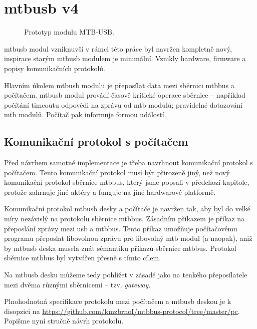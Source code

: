 \section{\gls{mtbusb} v4}

\begin{figure}[ht]
\caption{Prototyp modulu MTB-USB.}
\label{fig:mtbusb-prototype}
\end{figure}

\gls{mtbusb} modul vzniknuvší v rámci této práce byl navržen kompletně nový,
inspirace starým \gls{mtbusb} modulem je minimální. Vznikly hardware, firmware
a popisy komunikačních protokolů.

Hlavním úkolem \gls{mtbusb} modulu je přeposílat data mezi sběrnici \gls{mtbbus}
a počítačem. \gls{mtbusb} modul provádí časově kritické operace sběrnice
 – například počítání timeoutu odpovědi na zprávu od \gls{mtb} modulů; pravidelné
dotazování \gls{mtb} modulů. Počítač pak informuje formou událostí.

\subsection{Komunikační protokol s počítačem}

Před návrhem samotné implementace je třeba navrhnout komunikační protokol
s počítačem. Tento komunikační protokol musí být přirozeně jiný, než nový
komunikační protokol sběrnice \gls{mtbbus}, který jsme popsali v předchozí
kapitole, protože zahrnuje jiné aktéry a funguje na jiné hardwarové platformě.

Komunikační protokol \gls{mtbusb} desky a počítače je navržen tak, aby byl do
velké míry nezávislý na protokolu sběrnice \gls{mtbbus}. Zásadním příkazem
je příkaz na přeposlání zprávy mezi \gls{usb} a \gls{mtbbus}. Tento příkaz umožňuje
počítačovému programu přeposlat libovolnou zprávu pro libovolný \gls{mtb} modul
(a naopak), aniž by \gls{mtbusb} deska musela znát sémantiku příkazů sběrnice
\gls{mtbbus}. Protokol sběrnice \gls{mtbbus} byl vytvářen přesně s tímto
cílem.

Na \gls{mtbusb} desku můžeme tedy pohlížet v zásadě jako na tenkého
přeposílatele mezi dvěma různými sběrnicemi – tzv. \textit{gateway}.

Plnohodnotná specifikace protokolu mezi počítačem a \gls{mtbusb} deskou je
k disopzici na \url{https://github.com/kmzbrnoI/mtbbus-protocol/tree/master/pc}.
Popišme nyní stručně návrh protokolu.


